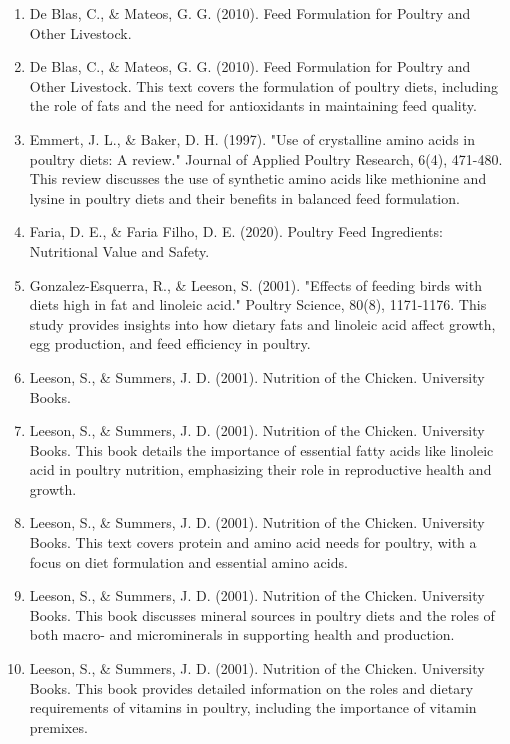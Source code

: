 \documentclass[a4paper,12pt]{article}
\begin{document}
\begin{enumerate}
	\item De Blas, C., \& Mateos, G. G. (2010). Feed Formulation for Poultry and Other Livestock.
	\item De Blas, C., \& Mateos, G. G. (2010). Feed Formulation for Poultry and Other Livestock. This text covers the formulation of poultry diets, including the role of fats and the need
for antioxidants in maintaining feed quality.

	\item Emmert, J. L., \& Baker, D. H. (1997). "Use of crystalline amino acids in poultry diets: A
review." Journal of Applied Poultry Research, 6(4), 471-480. This review discusses the
use of synthetic amino acids like methionine and lysine in poultry diets and their benefits
in balanced feed formulation.
	
	\item Faria, D. E., \& Faria Filho, D. E. (2020). Poultry Feed Ingredients: Nutritional Value and
Safety.

	\item Gonzalez-Esquerra, R., \& Leeson, S. (2001). "Effects of feeding birds with diets high in
fat and linoleic acid." Poultry Science, 80(8), 1171-1176. This study provides insights into
how dietary fats and linoleic acid affect growth, egg production, and feed efficiency in
poultry.

	\item Leeson, S., \& Summers, J. D. (2001). Nutrition of the Chicken. University Books.
	
	\item Leeson, S., \& Summers, J. D. (2001). Nutrition of the Chicken. University Books. This
book details the importance of essential fatty acids like linoleic acid in poultry nutrition,
emphasizing their role in reproductive health and growth.

	\item Leeson, S., \& Summers, J. D. (2001). Nutrition of the Chicken. University Books. This
text covers protein and amino acid needs for poultry, with a focus on diet formulation and
essential amino acids.

	\item Leeson, S., \& Summers, J. D. (2001). Nutrition of the Chicken. University Books. This
book discusses mineral sources in poultry diets and the roles of both macro- and
microminerals in supporting health and production.

	\item Leeson, S., \& Summers, J. D. (2001). Nutrition of the Chicken. University Books. This
book provides detailed information on the roles and dietary requirements of vitamins in
poultry, including the importance of vitamin premixes.


\end{enumerate}
\end{document}

